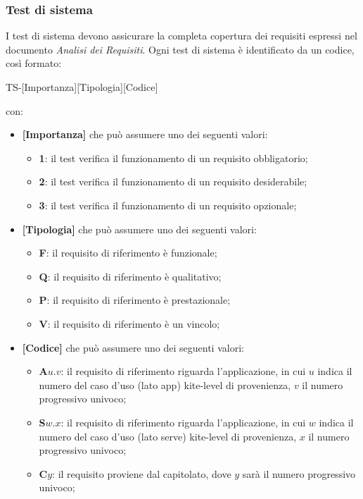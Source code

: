 \subsubsection{Test di sistema}
I test di sistema devono assicurare la completa copertura dei requisiti espressi nel documento \textit{Analisi dei Requisiti}.
Ogni test di sistema è identificato da un codice, così formato:
\begin{center}
    TS-[Importanza][Tipologia][Codice]
\end{center}
con:
\begin{itemize}
    \item \textbf{[Importanza]} che può assumere uno dei seguenti valori:
    \begin{itemize}
        \item \textbf{1}: il test verifica il funzionamento di un requisito obbligatorio;
        \item \textbf{2}: il test verifica il funzionamento di un requisito desiderabile;
        \item \textbf{3}: il test verifica il funzionamento di un requisito opzionale;
    \end{itemize}
    \item \textbf{[Tipologia]} che può assumere uno dei seguenti valori:
    \begin{itemize}
        \item \textbf{F}: il requisito di riferimento è funzionale;
        \item \textbf{Q}: il requisito di riferimento è qualitativo;
        \item \textbf{P}: il requisito di riferimento è prestazionale;
        \item \textbf{V}: il requisito di riferimento è un vincolo;
    \end{itemize}
    \item \textbf{[Codice]} che può assumere uno dei seguenti valori:
    \begin{itemize}
        \item \textbf{A}$u.v$: il requisito di riferimento riguarda l'applicazione, in cui $u$ indica il numero del caso d'uso (lato app) kite-level di provenienza, $v$ il numero progressivo univoco;
        \item \textbf{S}$w.x$: il requisito di riferimento riguarda l'applicazione, in cui $w$ indica il numero del caso d'uso (lato serve) kite-level di provenienza, $x$ il numero progressivo univoco;
        \item \textbf{C}$y$: il requisito proviene dal capitolato, dove $y$ sarà il numero progressivo univoco;

\end{itemize}
\end{itemize}

